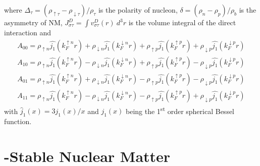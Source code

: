 where $\Delta_{\tau} = (\rho_{\uparrow \tau} - \rho_{\downarrow \tau})/\rho_{\tau}$ is the polarity of nucleon, $\delta = (\rho_n - \rho_p)/\rho_b$ is the asymmetry of \gls{NM}, $J^D_{\sigma\tau} = \int v^D_{\sigma\tau}(r)\: d^3 r$ is the volume integral of the direct interaction and
\begin{equation}
        \begin{array}{l}
                A_{00} = \rho_{\uparrow n} \hat{j_1}(k_F^{\uparrow n} r) + \rho_{\downarrow n} \hat{j_1}(k_F^{\downarrow n} r) + \rho_{\uparrow p} \hat{j_1}(k_F^{\uparrow p} r) + \rho_{\downarrow p} \hat{j_1}(k_F^{\downarrow p} r)\\[5pt]
                A_{10} = \rho_{\uparrow n} \hat{j_1}(k_F^{\uparrow n} r) - \rho_{\downarrow n} \hat{j_1}(k_F^{\downarrow n} r) + \rho_{\uparrow p} \hat{j_1}(k_F^{\uparrow p} r) - \rho_{\downarrow p} \hat{j_1}(k_F^{\downarrow p} r)\\[5pt]
                A_{01} = \rho_{\uparrow n} \hat{j_1}(k_F^{\uparrow n} r) + \rho_{\downarrow n} \hat{j_1}(k_F^{\downarrow n} r) - \rho_{\uparrow p} \hat{j_1}(k_F^{\uparrow p} r) - \rho_{\downarrow p} \hat{j_1}(k_F^{\downarrow p} r)\\[5pt]
                A_{11} = \rho_{\uparrow n} \hat{j_1}(k_F^{\uparrow n} r) - \rho_{\downarrow n} \hat{j_1}(k_F^{\downarrow n} r) - \rho_{\uparrow p} \hat{j_1}(k_F^{\uparrow p} r) + \rho_{\downarrow p} \hat{j_1}(k_F^{\downarrow p} r)
        \end{array}
\end{equation}
with $\hat{j}_1(x)=3j_1(x)/x$ and $j_1(x)$ being the 1\textsuperscript{st} order spherical Bessel function.

\section{\textbeta-Stable Nuclear Matter}%
\label{sec:textbeta_stable_nuclear_matter}

